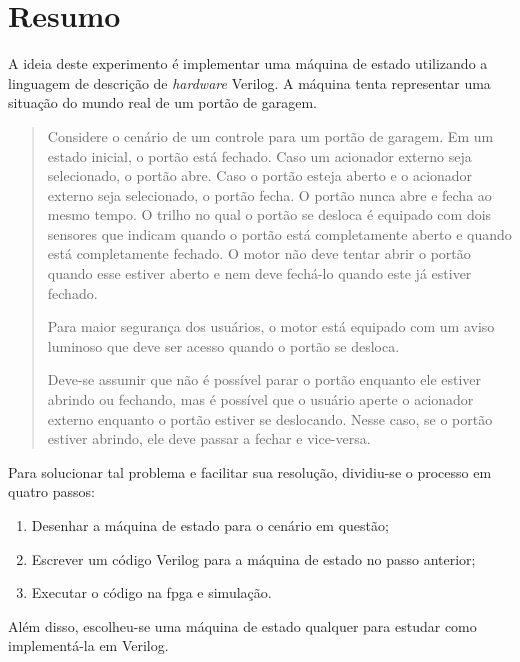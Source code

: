 \chapter{Resumo}
	A ideia deste experimento é implementar uma máquina de estado utilizando a linguagem de descrição
	de \textit{hardware} Verilog.
	A máquina tenta representar uma situação do mundo real de um portão de garagem.

	\begin{quotation}
		Considere o cenário de um controle para um portão de garagem. Em um estado inicial, o portão
		está fechado. Caso um acionador externo seja selecionado, o portão abre. Caso o portão esteja
		aberto e o acionador externo seja selecionado, o portão fecha. O portão nunca abre e fecha ao
		mesmo tempo. O trilho no qual o portão se desloca é equipado com dois sensores que indicam
		quando o portão está completamente aberto e quando está completamente fechado. O motor
		não deve tentar abrir o portão quando esse estiver aberto e nem deve fechá-lo quando este já
		estiver fechado.

		Para maior segurança dos usuários, o motor está equipado com um aviso luminoso que deve ser
		acesso quando o portão se desloca.

		Deve-se assumir que não é possível parar o portão enquanto ele estiver abrindo ou fechando,
		mas é possível que o usuário aperte o acionador externo enquanto o portão estiver se
		deslocando. Nesse caso, se o portão estiver abrindo, ele deve passar a fechar e vice-versa.
	\end{quotation}

	Para solucionar tal problema e facilitar sua resolução, dividiu-se o processo em quatro passos:
	\begin{enumerate}
	   \item Desenhar a máquina de estado para o cenário em questão;
	   \item Escrever um código Verilog para a máquina de estado no passo anterior;
	   \item Executar o código na \ac{fpga} e simulação.
	 \end{enumerate}

	 Além disso, escolheu-se uma máquina de estado qualquer para estudar como
	 implementá-la em Verilog.
